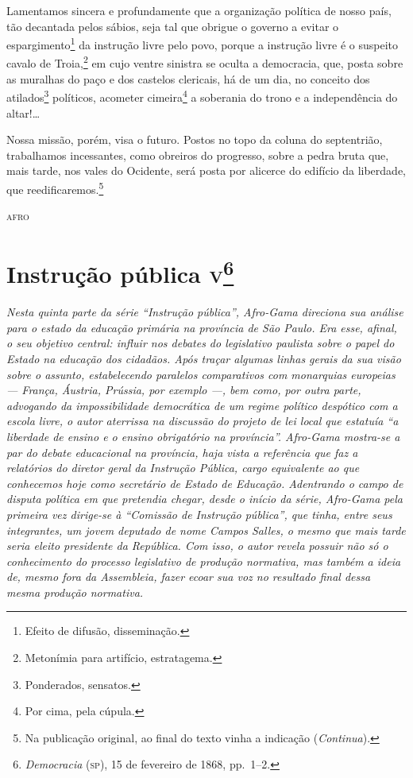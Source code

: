 Lamentamos sincera e profundamente que a organização política de nosso
país, tão decantada pelos sábios, seja tal que obrigue o governo a
evitar o espargimento\footnote{Efeito de difusão, disseminação.} da
instrução livre pelo povo, porque a instrução livre é o suspeito cavalo
de Troia,\footnote{Metonímia para artifício, estratagema.} em cujo
ventre sinistra se oculta a democracia, que, posta sobre as muralhas do
paço e dos castelos clericais, há de um dia, no conceito dos
atilados\footnote{Ponderados, sensatos.} políticos, acometer
cimeira\footnote{Por cima, pela cúpula.} a soberania do trono e a
independência do altar!\ldots{}

Nossa missão, porém, visa o futuro. Postos no topo da coluna do
septentrião, trabalhamos incessantes, como obreiros do progresso, sobre
a pedra bruta que, mais tarde, nos vales do Ocidente, será posta por
alicerce do edifício da liberdade, que reedificaremos.\footnote{Na publicação original, ao final do texto vinha a indicação (\emph{Continua}).}



\begin{flushright}
\textsc{afro}
\end{flushright}

\chapter{Instrução pública \textsc{v}\footnote{\emph{Democracia} (\textsc{sp}),
  15 de fevereiro de 1868, pp.~1--2.}} %

\begin{didascalia}\itshape
Nesta quinta parte da série ``Instrução pública'', Afro-Gama
direciona sua análise para o estado da educação primária na província de
São Paulo. Era esse, afinal, o seu objetivo central: influir nos debates
do legislativo paulista sobre o papel do Estado na educação dos
cidadãos. Após traçar algumas linhas gerais da sua visão sobre o
assunto, estabelecendo paralelos comparativos com monarquias europeias
--- França, Áustria, Prússia, por exemplo ---, bem como, por outra parte,
advogando da impossibilidade democrática de um regime político despótico
com a escola livre, o autor aterrissa na discussão do projeto de lei
local que estatuía ``a liberdade de ensino e o ensino obrigatório na
província''. Afro-Gama mostra-se a par do debate educacional na
província, haja vista a referência que faz a relatórios do diretor geral
da Instrução Pública, cargo equivalente ao que conhecemos hoje como
secretário de Estado de Educação. Adentrando o campo de disputa política
em que pretendia chegar, desde o início da série, Afro-Gama pela
primeira vez dirige-se à ``Comissão de Instrução pública'', que tinha,
entre seus integrantes, um jovem deputado de nome Campos Salles, o mesmo
que mais tarde seria eleito presidente da República. Com isso, o autor
revela possuir não só o conhecimento do processo legislativo de produção
normativa, mas também a ideia de, mesmo fora da Assembleia, fazer ecoar
sua voz no resultado final dessa mesma produção normativa.
\end{didascalia}



